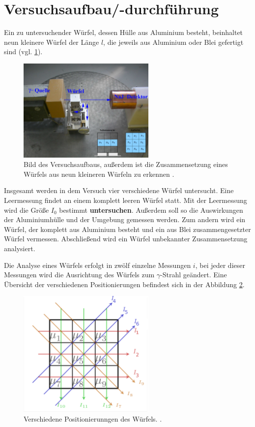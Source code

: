 \section{Versuchsaufbau/-durchführung}
Ein zu untersuchender Würfel, dessen Hülle aus Aluminium besteht, beinhaltet neun kleinere Würfel der Länge $l$,
die jeweils aus Aluminium oder Blei gefertigt sind (vgl. \ref{fig: aufbau}).

\begin{figure}[h]
  \centering
  \includegraphics[width=0.6\textwidth]{pics/Aufbau.pdf}
  \caption{Bild des Versuchsaufbaus, außerdem ist die Zusammensetzung eines Würfels aus neun kleineren Würfeln zu erkennen \cite{anleitungb14}.}
  \label{fig: aufbau}
\end{figure}

Insgesamt werden in dem Versuch vier verschiedene Würfel untersucht. Eine Leermessung findet an
einem komplett leeren Würfel statt. Mit der Leermessung wird die Größe $I_0$ bestimmt \textbf{untersuchen}.
Außerdem soll so die Auswirkungen der Aluminiumhülle und der Umgebung gemessen werden.
Zum andern wird ein Würfel, der komplett aus Aluminium besteht und
ein aus Blei zusammengesetzter Würfel vermessen. Abschließend wird ein Würfel
unbekannter Zusammensetzung analysiert.

Die Analyse eines Würfels erfolgt in zwölf einzelne Messungen $i$,
bei jeder dieser Messungen wird die Ausrichtung des Würfels zum $\gamma$-Strahl geändert.
Eine Übersicht der verschiedenen Positionierungen befindest sich in der Abbildung \ref{fig: positionierung}.

\begin{figure}[h]
  \centering
  \includegraphics[width=0.6\textwidth]{pics/positionierung.pdf}
  \caption{Verschiedene Positionierunngen des Würfels. \cite{luckyjosh}.}
  \label{fig: positionierung}
\end{figure}

